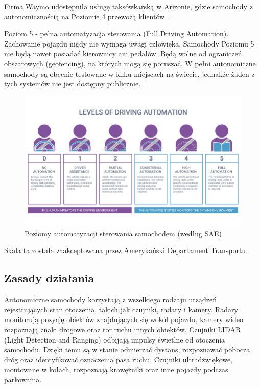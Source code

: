 \begin{enumerate*}
\begin{itemize*}
\item Firma Waymo udostępniła usługę taksówkarską w Arizonie, gdzie samochody z autonomicznością na Poziomie 4 przewożą klientów  \cite{waymoAutonomousTaxi}.
\end{itemize*}
\item Poziom 5 - pełna automatyzacja sterowania (Full Driving Automation). Zachowanie pojazdu nigdy nie wymaga uwagi człowieka. Samochody Poziomu 5 nie będą nawet posiadać kierownicy ani pedałów. Będą wolne od ograniczeń obszarowych (geofencing), na których mogą się poruszać. W pełni autonomiczne samochody są obecnie testowane w kilku miejscach na świecie, jednakże żaden z tych systemów nie jest dostępny publicznie.
\end{enumerate*}

\begin{figure}[h]
\begin{center}
\includegraphics[width=15cm]{resources/figures/automation_levels.jpg}
\caption{Poziomy automatyzacji sterowania samochodem (według SAE)}
\label{CarAutomationLevels}
\end{center}
\end{figure}

Skala ta została zaakceptowana przez Amerykański Departament Transportu.

\subsection{Zasady działania}
Autonomiczne samochody korzystają z wszelkiego rodzaju urządzeń rejestrujących stan otoczenia, takich jak czujniki, radary i kamery. Radary monitorują pozycję obiektów znajdujących się wokół pojazdu, kamery wideo rozpoznają znaki drogowe oraz tor ruchu innych obiektów. Czujniki LIDAR (Light Detection and Ranging) odbijają impulsy świetlne od otoczenia samochodu. Dzięki temu są w stanie odmierzać dystans, rozpoznawać pobocza dróg oraz identyfikować oznaczenia pasa ruchu.
Czujniki ultradźwiękowe, montowane w kołach, rozpoznają krawężniki oraz inne pojazdy podczas parkowania.

